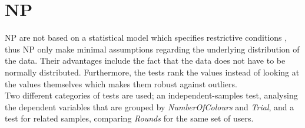 %
%
\section{\acf{NP}}
\label{ch:Evaluation:sec:Non-parametrictest}

\ac{NP} are not based on a statistical model which specifies restrictive conditions \citep{Siegel1957}, thus \ac{NP} only make minimal assumptions regarding the underlying distribution of the data. Their advantages include the fact that the data does not have to be normally distributed. Furthermore, the tests rank the values instead of looking at the values themselves which makes them robust against outliers.\\
Two different categories of tests are used; an independent-samples test, analysing the dependent variables that are grouped by \textit{NumberOfColours} and \textit{Trial}, and a test for related samples, comparing \textit{Rounds} for the same set of users. 

